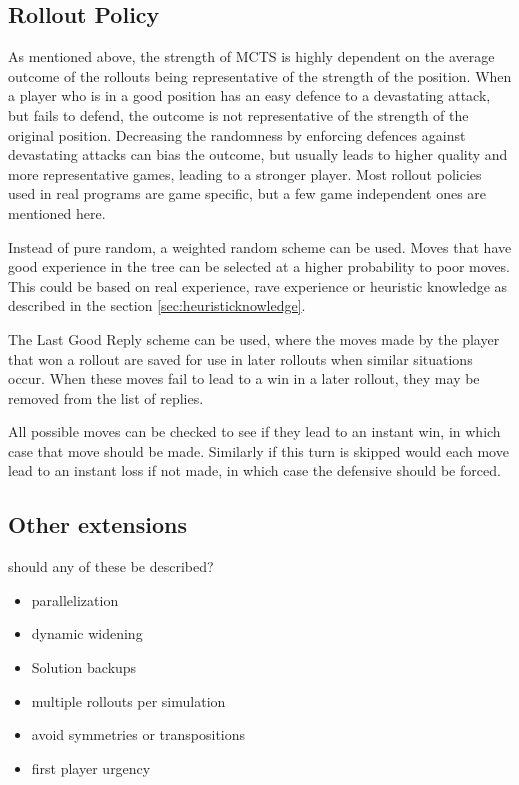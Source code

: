 \subsection{Rollout Policy}

As mentioned above, the strength of MCTS is highly dependent on the average outcome of the rollouts being representative of the strength of the position. When a player who is in a good position has an easy defence to a devastating attack, but fails to defend, the outcome is not representative of the strength of the original position. Decreasing the randomness by enforcing defences against devastating attacks can bias the outcome, but usually leads to higher quality and more representative games, leading to a stronger player. Most rollout policies used in real programs are game specific, but a few game independent ones are mentioned here.

Instead of pure random, a weighted random scheme can be used. Moves that have good experience in the tree can be selected at a higher probability to poor moves. This could be based on real experience, rave experience or heuristic knowledge as described in the section \ref{sec:heuristicknowledge}.

The Last Good Reply scheme can be used, where the moves made by the player that won a rollout are saved for use in later rollouts when similar situations occur. When these moves fail to lead to a win in a later rollout, they may be removed from the list of replies.

All possible moves can be checked to see if they lead to an instant win, in which case that move should be made. Similarly if this turn is skipped would each move lead to an instant loss if not made, in which case the defensive should be forced.



\subsection{Other extensions}

should any of these be described?

\begin{itemize}
\item parallelization
\item dynamic widening
\item Solution backups
\item multiple rollouts per simulation
\item avoid symmetries or transpositions
\item first player urgency
\end{itemize}

